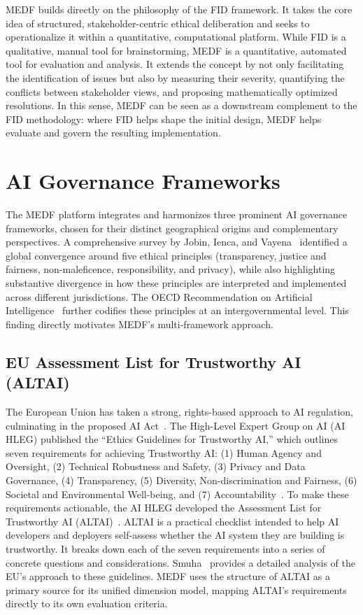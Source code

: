 MEDF builds directly on the philosophy of the FID framework. It takes the core idea of structured, stakeholder-centric ethical deliberation and seeks to operationalize it within a quantitative, computational platform. While FID is a qualitative, manual tool for brainstorming, MEDF is a quantitative, automated tool for evaluation and analysis. It extends the concept by not only facilitating the identification of issues but also by measuring their severity, quantifying the conflicts between stakeholder views, and proposing mathematically optimized resolutions. In this sense, MEDF can be seen as a downstream complement to the FID methodology: where FID helps shape the initial design, MEDF helps evaluate and govern the resulting implementation.

\section{AI Governance Frameworks}
\label{sec:governance}

The MEDF platform integrates and harmonizes three prominent AI governance frameworks, chosen for their distinct geographical origins and complementary perspectives. A comprehensive survey by Jobin, Ienca, and Vayena~\cite{jobin2019landscape} identified a global convergence around five ethical principles (transparency, justice and fairness, non-maleficence, responsibility, and privacy), while also highlighting substantive divergence in how these principles are interpreted and implemented across different jurisdictions. The OECD Recommendation on Artificial Intelligence~\cite{oecd2019ai} further codifies these principles at an intergovernmental level. This finding directly motivates MEDF's multi-framework approach.

\subsection{EU Assessment List for Trustworthy AI (ALTAI)}
\label{sec:altai}

The European Union has taken a strong, rights-based approach to AI regulation, culminating in the proposed AI Act~\cite{ec2021aiact}. The High-Level Expert Group on AI (AI HLEG) published the \enquote{Ethics Guidelines for Trustworthy AI,} which outlines seven requirements for achieving Trustworthy AI: (1) Human Agency and Oversight, (2) Technical Robustness and Safety, (3) Privacy and Data Governance, (4) Transparency, (5) Diversity, Non-discrimination and Fairness, (6) Societal and Environmental Well-being, and (7) Accountability~\cite{aihleg2019ethics}. To make these requirements actionable, the AI HLEG developed the Assessment List for Trustworthy AI (ALTAI)~\cite{aihleg2020altai}. ALTAI is a practical checklist intended to help AI developers and deployers self-assess whether the AI system they are building is trustworthy. It breaks down each of the seven requirements into a series of concrete questions and considerations. Smuha~\cite{smuha2019eu} provides a detailed analysis of the EU's approach to these guidelines. MEDF uses the structure of ALTAI as a primary source for its unified dimension model, mapping ALTAI's requirements directly to its own evaluation criteria.

